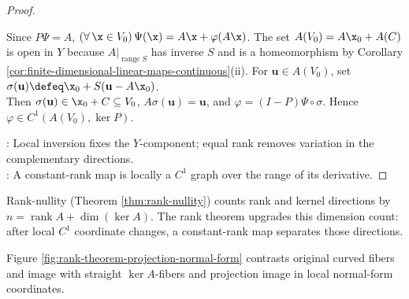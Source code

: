 \begin{theorem}
\begin{proof}
\begin{enumerate}[label=(\roman*)]
Since $P\Psi=A$, $(\forall\,\x\in V_0)\,\Psi(\x)=A\x+\varphi(A\x)$. The set $A(V_0)=A\x_0+A(C)$ is open in $Y$ because $A|_{\operatorname{range}S}$ has inverse $S$ and is a homeomorphism by Corollary \ref{cor:finite-dimensional-linear-maps-continuous}(ii). For $\mathbf{u}\in A(V_0)$, set $\sigma(\mathbf{u})\defeq\x_0+S(\mathbf{u}-A\x_0)$.\\
Then $\sigma(\mathbf{u})\in\x_0+C\subseteq V_0$, $A\sigma(\mathbf{u})=\mathbf{u}$, and $\varphi=(I-P)\Psi\circ\sigma$. Hence $\varphi\in C^1(A(V_0),\ker P)$.
\end{enumerate}
: Local inversion fixes the $Y$-component; equal rank removes variation in the complementary directions.\\
: A constant-rank map is locally a $C^1$ graph over the range of its derivative.
\end{proof}
\end{theorem}

Rank-nullity (Theorem \ref{thm:rank-nullity}) counts rank and kernel directions by $n=\operatorname{rank}A+\dim(\ker A)$. The rank theorem upgrades this dimension count: after local $C^1$ coordinate changes, a constant-rank map separates those directions.

\noindent Figure \ref{fig:rank-theorem-projection-normal-form} contrasts original curved fibers and image with straight $\ker A$-fibers and projection image in local normal-form coordinates.
\begin{illustrationfigure}[H]
  \centering
  
  \caption{The upper panels depict curved fibers and image before normalization; the lower panels depict straight $\ker A$-fibers and projection onto the rank directions.}
  \label{fig:rank-theorem-projection-normal-form}
\end{illustrationfigure}

